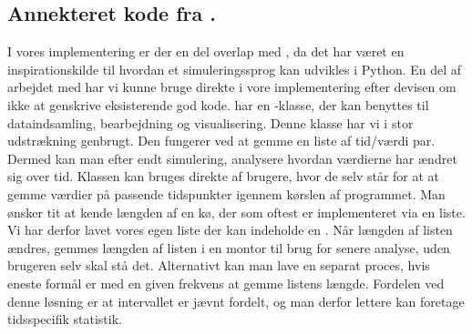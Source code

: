 \subsection{Annekteret kode fra \simpy.}
I vores implementering er der en del overlap med \simpy, da det har været en inspirationskilde til hvordan et simuleringssprog kan udvikles i Python. En del af arbejdet med \simpy har vi kunne bruge direkte i vore implementering efter devisen om ikke at genskrive eksisterende god kode. \simpy har en -klasse, der kan benyttes til dataindsamling, bearbejdning og visualisering. Denne klasse har vi i stor udstrækning genbrugt. Den fungerer ved at gemme en liste af tid/værdi par. Dermed kan man efter endt simulering, analysere  hvordan værdierne har ændret sig over tid. Klassen  kan bruges direkte af brugere, hvor de selv  står for at at gemme værdier på passende tidspunkter igennem kørslen af programmet. Man ønsker tit at kende længden af en kø, der som oftest er implementeret via en liste. Vi har derfor lavet vores egen liste der kan indeholde en . Når længden af listen ændres, gemmes længden af listen i en montor til brug for senere analyse, uden brugeren selv skal stå det. Alternativt kan man lave en separat proces, hvis eneste formål er med en given frekvens at gemme listens længde. Fordelen ved denne løsning er at intervallet er jævnt fordelt, og man derfor lettere kan foretage tidsspecifik statistik.
